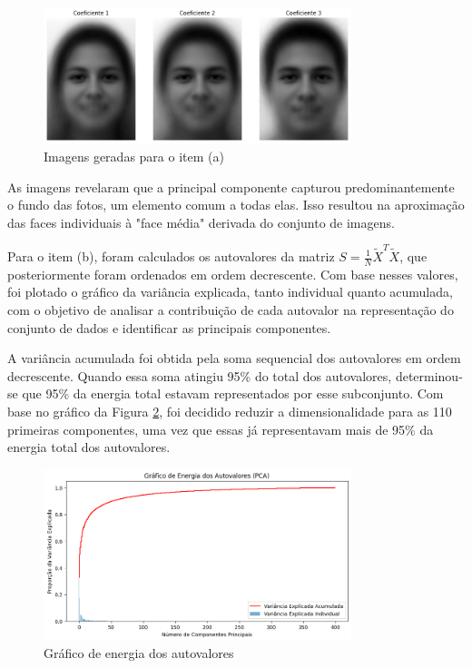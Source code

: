 \documentclass[a4paper, 11pt]{article}
\begin{document}
\begin{figure} [H]
    \centering 
    \includegraphics[width=0.8\textwidth]{imgs/2-a.png}
    \caption{Imagens geradas para o item (a)}
    \label{fig:a} %
\end{figure}

As imagens revelaram que a principal componente capturou predominantemente o fundo das fotos, um elemento comum a todas elas. Isso resultou na aproximação das faces individuais à "face média" derivada do conjunto de imagens.

Para o item (b), foram calculados os autovalores da matriz \( S = \frac{1}{N} \tilde{X}^T \tilde{X} \), que posteriormente foram ordenados em ordem decrescente. Com base nesses valores, foi plotado o gráfico da variância explicada, tanto individual quanto acumulada, com o objetivo de analisar a contribuição de cada autovalor na representação do conjunto de dados e identificar as principais componentes.

A variância acumulada foi obtida pela soma sequencial dos autovalores em ordem decrescente. Quando essa soma atingiu 95\% do total dos autovalores, determinou-se que 95\% da energia total estavam representados por esse subconjunto. Com base no gráfico da Figura \ref{fig:var}, foi decidido reduzir a dimensionalidade para as 110 primeiras componentes, uma vez que essas já representavam mais de 95\% da energia total dos autovalores.

\begin{figure} [h]
    \centering 
    \includegraphics[width=0.8\textwidth]{imgs/var.png}
    \caption{Gráfico de energia dos autovalores}
    \label{fig:var} %
\end{figure}
\end{document}
